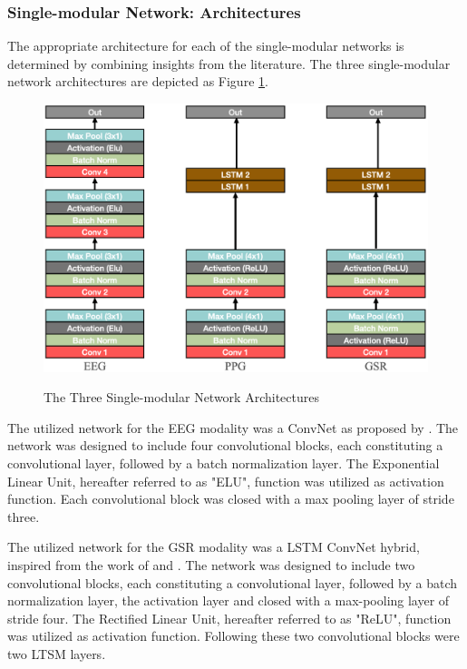 \documentclass[12pt]{article}
\begin{document}
\subsubsection{Single-modular Network: Architectures}
The appropriate architecture for each of the single-modular networks is determined by combining insights from the literature. The three single-modular network architectures are depicted as Figure \ref{fig:singlearchitecture}.

\begin{figure}
\caption{The Three Single-modular Network Architectures}
\bigskip
\includegraphics[scale=0.725]{single_model_architecture}
\label{fig:singlearchitecture}
\end{figure}

The utilized network for the EEG modality was a ConvNet as proposed by . The network was designed to include four convolutional blocks, each constituting a convolutional layer, followed by a batch normalization layer. The Exponential Linear Unit, hereafter referred to as "ELU", function was utilized as activation function. Each convolutional block was closed with a max pooling layer of stride three.

The utilized network for the GSR modality was a LSTM ConvNet hybrid, inspired from the work of  and . The network was designed to include two convolutional blocks, each constituting a convolutional layer, followed by a batch normalization layer, the activation layer and closed with a max-pooling layer of stride four. The Rectified Linear Unit, hereafter referred to as "ReLU", function was utilized as activation function. Following these two convolutional blocks were two LTSM layers.
\end{document}
